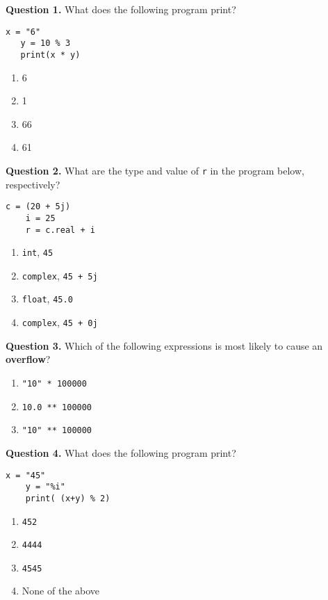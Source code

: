 \documentclass[12pt]{article}
\begin{document}

\bigskip

{\bf Question 1.} What does the following program print?
\begin{lstlisting}[frame=single]
   x = "6"
   y = 10 % 3
   print(x * y)
\end{lstlisting}

\begin{enumerate}[label=\Alph*]
	\item  6
	\item  1
	\item  66
	\item  61
\end{enumerate}


{\bf Question 2.}  What are the type and value of \texttt{r} in the program below, respectively?
\begin{lstlisting}[frame=single]
  	c = (20 + 5j)
  	i = 25
  	r = c.real + i
\end{lstlisting}
  
   \begin{enumerate}[label=\Alph*]
   	\item  \texttt{int}, \texttt{45}
   	\item  \texttt{complex}, \texttt{45 + 5j}
   	\item  \texttt{float}, \texttt{45.0}
   	\item  \texttt{complex}, \texttt{45 + 0j}
   \end{enumerate}


{\bf Question 3.} Which of the following expressions is most likely to cause an \textbf{overflow}?
 \begin{enumerate}[label=\Alph*]
 	\item  \texttt{"10" * 100000}
 	\item  \texttt{10.0 ** 100000}
 	\item  \texttt{"10" ** 100000}
 \end{enumerate}

{\bf Question 4.} What does the following program print?
\begin{lstlisting}[frame=single]
	x = "45"
	y = "%i"
	print( (x+y) % 2)
\end{lstlisting}
\begin{enumerate}[label=\Alph*]
	\item  \texttt{452}
	\item  \texttt{4444}
	\item  \texttt{4545}
	\item  None of the above
\end{enumerate}
\end{document}
